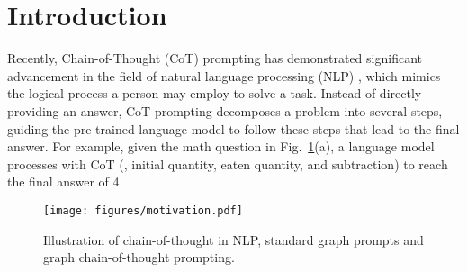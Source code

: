 \section{Introduction}
Recently, Chain-of-Thought (CoT) prompting has demonstrated significant advancement in the field of natural language processing (NLP) \cite{wei2022chain,wang2023self,chu2023survey}, which mimics the logical process a person may employ to solve a task. Instead of directly providing an answer, CoT prompting decomposes a problem into several steps, guiding the pre-trained language model to follow these steps that lead to the final answer. For example, 
given the math question in Fig.~\ref{fig.intro-motivation}(a), a language model processes with CoT (\eg, initial quantity, eaten quantity, and subtraction) to reach the final answer of 4.

\begin{figure}[t]
\centering
\texttt{[image: figures/motivation.pdf]}
\caption{Illustration of chain-of-thought in NLP, standard graph prompts and graph chain-of-thought prompting.}
\label{fig.intro-motivation}
\end{figure}

